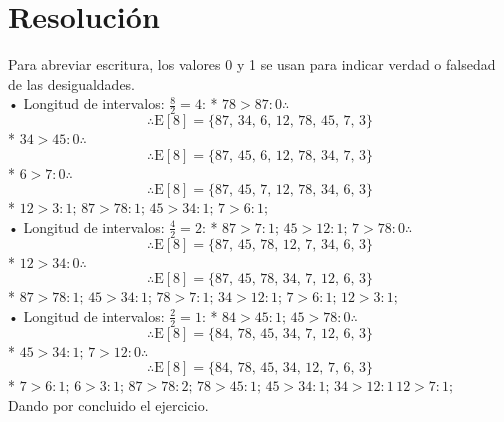 \documentclass[letterpaper, 12pt]{article}
\begin{document}
    \section{Resolución}
    Para abreviar escritura, los valores 0 y 1 se usan para indicar verdad o falsedad de las desigualdades.
    \\\newline• Longitud de intervalos: \(\frac{8}{2}=4\): \newline
    * \(78>87:0 \therefore\)
    \[\therefore \text{E}[8]=\{87,\,34,\,6,\,12,\,78,\,45,\,7,\,3\}\]
    * \(34>45:0 \therefore\)
    \[\therefore \text{E}[8]=\{87,\,45,\,6,\,12,\,78,\,34,\,7,\,3\}\]
    * \(6>7:0\therefore\)
    \[\therefore \text{E}[8]=\{87,\,45,\,7,\,12,\,78,\,34,\,6,\,3\}\]
    * \(12>3:1;\,87>78:1;\,45>34:1;\,7>6:1;\)
    \\\newline
    • Longitud de intervalos: \(\frac{4}{2}=2\): \newline
    * \(87>7:1;\, 45>12:1;\, 7>78:0\therefore\)
    \[\therefore \text{E}[8]=\{87,\,45,\,78,\,12,\,7,\,34,\,6,\,3\}\]
    * \(12>34:0\therefore\)
    \[\therefore \text{E}[8]=\{87,\,45,\,78,\,34,\,7,\,12,\,6,\,3\}\]
    * \(87>78:1;\,45>34:1;\,78>7:1;\,34>12:1;\,7>6:1;\,12>3:1;\)
    \\\newline
    • Longitud de intervalos: \(\frac{2}{2}=1\): \newline
    * \(84>45:1;\, 45>78:0 \therefore\)
    \[\therefore \text{E}[8]=\{84,\,78,\,45,\,34,\,7,\,12,\,6,\,3\}\]
    * \(45>34:1;\, 7>12:0 \therefore\)
    \[\therefore \text{E}[8]=\{84,\,78,\,45,\,34,\,12,\,7,\,6,\,3\}\]
    * \(7>6:1;\, 6>3:1;\, 87>78:2;\, 78>45:1;\, 45>34:1;\, 34>12:1\, 12>7:1;\)
    \\\newline
    Dando por concluido el ejercicio.
\end{document}
